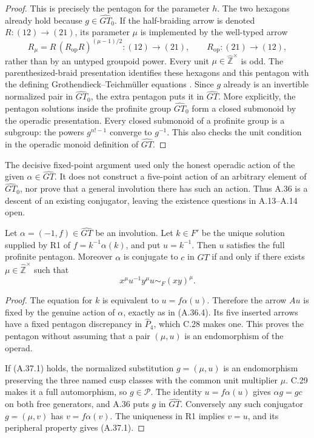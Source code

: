 \begin{proof}
This is precisely the pentagon for the parameter
\(h\). The two hexagons already hold because
\(g\in\widehat{GT}_0\). If the half-braiding arrow is
denoted \(R:(12)\to(21)\), its parameter \(\mu\) is
implemented by the well-typed arrow
\[
 R_\mu=R\,(R_{\mathrm{op}}R)^{(\mu-1)/2}:(12)\to(21),
 \qquad R_{\mathrm{op}}:(21)\to(12),
\]
rather than by an untyped groupoid power. Every unit
\(\mu\in\widehat{\mathbb Z}^{\times}\) is odd.
The parenthesized-braid presentation identifies these
hexagons and this pentagon with the defining
Grothendieck--Teichm\"uller equations
\cite[Lemma 7.1 and Proposition 7.3]{CEBHR2019}.
Since \(g\) already is an invertible normalized
pair in \(\widehat{GT}_0\), the extra pentagon puts
it in \(\widehat{GT}\). More explicitly, the pentagon
solutions inside the profinite group \(\widehat{GT}_0\)
form a closed submonoid by the operadic presentation.
Every closed submonoid of a profinite group is a
subgroup: the powers \(g^{n!-1}\) converge to
\(g^{-1}\). This also checks the unit condition in
the operadic monoid definition of \(\widehat{GT}\).
\end{proof}

The decisive fixed-point argument used only the honest
operadic action of the given \(\alpha\in\widehat{GT}\).
It does not construct a five-point action of an
arbitrary element of \(\widehat{GT}_0\), nor prove
that a general involution there has such an action.
Thus A.36 is a descent of an existing conjugator,
leaving the existence questions in A.13--A.14 open.

Let \(\alpha=(-1,f)\in\widehat{GT}\) be an involution.
Let \(k\in F'\) be the unique solution supplied by R1
of \(f=k^{-1}\alpha(k)\), and put \(u=k^{-1}\).
Then \(u\) satisfies the full profinite pentagon.
Moreover \(\alpha\) is conjugate to \(c\) in
\(\widehat{GT}\) if and only if there exists
\(\mu\in\widehat{\mathbb Z}^{\times}\) such that
\[
                 x^\mu u^{-1}y^\mu u\sim_F(xy)^\mu.
 \tag{A.37.1}
\]

\begin{proof}
The equation for \(k\) is equivalent to
\(u=f\alpha(u)\). Therefore the arrow \(A u\)
is fixed by the genuine action of \(\alpha\),
exactly as in (A.36.4). Its five inserted arrows
have a fixed pentagon discrepancy in \(\widehat P_4\),
which C.28 makes one. This proves the pentagon
without assuming that a pair \((\mu,u)\) is an
endomorphism of the operad.

If (A.37.1) holds, the normalized substitution
\(g=(\mu,u)\) is an endomorphism preserving the
three named cusp classes with the common unit
multiplier \(\mu\). C.29 makes it a full
automorphism, so \(g\in\mathcal P\).
The identity \(u=f\alpha(u)\) gives
\(\alpha g=g c\) on both free generators, and
A.36 puts \(g\) in \(\widehat{GT}\).
Conversely any such conjugator \(g=(\mu,v)\)
has \(v=f\alpha(v)\). The uniqueness in R1
implies \(v=u\), and its peripheral property gives
(A.37.1).
\end{proof}

